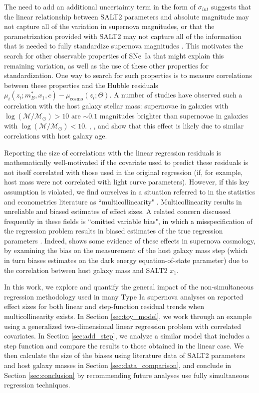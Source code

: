 The need to add an additional uncertainty term in the form of $\sigma_{int}$ suggests that the linear relationship between SALT2 parameters and absolute magnitude may not capture all of the variation in supernova magnitudes, or that the parametrization provided with SALT2 may not capture all of the information that is needed to fully standardize supernova magnitudes \citep{saunders_snemo_2018}. This motivates the search for other observable properties of SNe~Ia that might explain this remaining variation, as well as the use of these other properties for standardization. One way to search for such properties is to measure correlations between these properties and the Hubble residuals $\mu_i(z_i;m_B^*, x_1, c)-\mu_\text{cosmo}(z_i;\Theta)$. A number of studies \citep{kelly_hubble_2010, lampeitl_effect_2010, sullivan_dependence_2010, childress_host_2013} have observed such a correlation with the host galaxy stellar mass: supernovae in galaxies with $\log(\mathcal{M}/\mathcal{M}_\odot) > 10$ are $\sim0.1$ magnitudes brighter than supernovae in galaxies with $\log(\mathcal{M}/\mathcal{M}_\odot) < 10$. \cite{rigault_evidence_2013}, \cite{childress_ages_2014}, and  \cite{rigault_confirmation_2015} show that this effect is likely due to similar correlations with host galaxy age.

Reporting the size of correlations with the linear regression residuals is mathematically well-motivated if the covariate used to predict these residuals is not itself correlated with those used in the original regression (if, for example, host mass were not correlated with light curve parameters). However, if this key assumption is violated, we find ourselves in a situation referred to in the statistics and econometrics literature as ``multicollinearity" \cite[e.g.][]{farrar_multicollinearity_1967}. Multicollinearity results in unreliable and biased estimates of effect sizes.  A related concern discussed frequently  in these fields is ``omitted variable bias", in which a misspecification of the regression problem results in biased estimates of the true regression parameters \citep{clarke_phantom_2005, wooldridge_introductory_2013}. Indeed, \cite{smith_first_2020} shows some evidence of these effects in supernova cosmology, by  examining the bias on the measurement of the host galaxy mass step (which in turn biases estimates on the dark energy equation-of-state parameter) due to the correlation between host galaxy mass and SALT2 $x_1$.

In this work, we explore and quantify the general impact of the non-simultaneous regression methodology used in many Type Ia supernova analyses on reported effect sizes for both linear and step-function residual trends when multicollinearity exists. In Section \ref{sec:toy_model}, we work through an example using a generalized two-dimensional linear regression problem with correlated covariates. In Section \ref{sec:add_step}, we analyze a similar model that includes a step function and compare the results to those obtained in the linear case. We then calculate the size of the biases using literature data of SALT2 parameters and host galaxy masses in Section \ref{sec:data_comparison}, and conclude in Section \ref{sec:conclusion} by recommending future analyses use fully simultaneous regression techniques.

